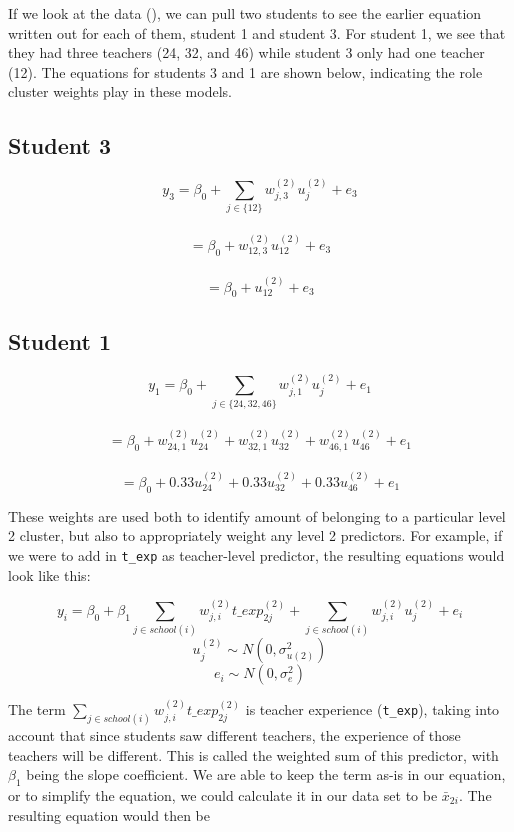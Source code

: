 \documentclass[
]{book}
\begin{document}
If we look at the data (), we can pull two students to see the earlier equation written out for each of them, student 1 and student 3. For student 1, we see that they had three teachers (24, 32, and 46) while student 3 only had one teacher (12). The equations for students 3 and 1 are shown below, indicating the role cluster weights play in these models.

\hypertarget{student-3}{%
\subsection{Student 3}\label{student-3}}

\[y_{3} = \beta_{0} + \sum_{j \in \{12\}}w_{j,3}^{(2)}u_{j}^{(2)} + e_{3}\]\\
\[ = \beta_{0} + w_{12,3}^{(2)}u_{12}^{(2)} + e_{3}\]\\
\[ = \beta_{0} + u_{12}^{(2)} + e_{3}\]

\hypertarget{student-1}{%
\subsection{Student 1}\label{student-1}}

\[y_{1} = \beta_{0} + \sum_{j \in \{24, 32, 46\}}w_{j,1}^{(2)}u_{j}^{(2)} + e_{1}\]\\
\[ = \beta_{0} + w_{24,1}^{(2)}u_{24}^{(2)} + w_{32,1}^{(2)}u_{32}^{(2)} + w_{46,1}^{(2)}u_{46}^{(2)}+ e_{1}\]\\
\[ = \beta_{0} + 0.33u_{24}^{(2)} + 0.33u_{32}^{(2)} + 0.33u_{46}^{(2)}+ e_{1}\]

These weights are used both to identify amount of belonging to a particular level 2 cluster, but also to appropriately weight any level 2 predictors. For example, if we were to add in \texttt{t\_exp} as teacher-level predictor, the resulting equations would look like this:

\[y_{i} = \beta_{0} + \beta_{1}\sum_{j \in school(i)}w_{j,i}^{(2)}t\_exp_{2j}^{(2)} + \sum_{j \in school(i)}w_{j,i}^{(2)}u_{j}^{(2)} + e_{i}\]
\[u_{j}^{(2)} \sim N(0, \sigma_{u(2)}^{2})\]
\[e_{i} \sim N(0, \sigma_{e}^{2})\]

The term \(\sum_{j \in school(i)}w_{j,i}^{(2)}t\_exp_{2j}^{(2)}\) is teacher experience (\texttt{t\_exp}), taking into account that since students saw different teachers, the experience of those teachers will be different. This is called the weighted sum of this predictor, with \(\beta_{1}\) being the slope coefficient. We are able to keep the term as-is in our equation, or to simplify the equation, we could calculate it in our data set to be \(\bar x_{2i}\). The resulting equation would then be
\end{document}
